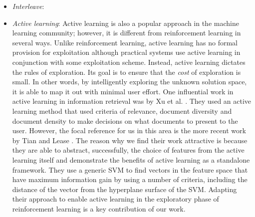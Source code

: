 \documentclass{acm_proc_article-sp}
\begin{document}
\begin{itemize}
\item \emph{Interleave}:  
\item \emph{Active learning}: Active learning is also a popular approach in the machine learning community; however, it is different from reinforcement learning in several ways. Unlike reinforcement learning, active learning has no formal provision for exploitation although practical systems use active learning in conjunction with some exploitation scheme. Instead, active learning dictates the rules of exploration. Its goal is to ensure that the \emph{cost} of exploration is small. In other words, by intelligently exploring the unknown solution space, it is able to map it out with minimal user effort. One influential work in active learning in information retrieval was by Xu et al. \cite{active2}. They used an active learning method that used criteria of relevance, document diversity and document density to make decisions on what documents to present to the user. However, the focal reference for us in this area is the more recent work by Tian and Lease \cite{aibo}. The reason why we find their work attractive is because they are able to abstract, successfully, the choice of features from the active learning itself and demonstrate the benefits of active learning as a standalone framework. They use a generic SVM to find vectors in the feature space that have maximum information gain by using a number of criteria, including the distance of the vector from the hyperplane surface of the SVM. Adapting their approach to enable active learning in the exploratory phase of reinforcement learning is a key contribution of our work. 
\end{itemize}
\end{document}
